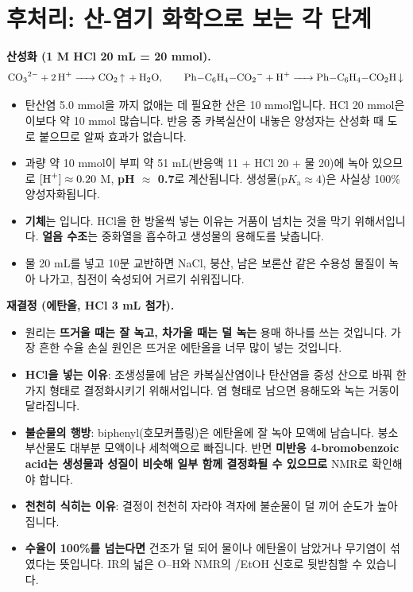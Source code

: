 \documentclass[10pt,a4paper]{article}
\begin{document}
\section{후처리: 산-염기 화학으로 보는 각 단계}

\textbf{산성화 (1 M HCl 20 mL = 20 mmol).}
\[
\ce{CO3^2- + 2 H+ -> CO2 ^ + H2O}, \qquad \ce{Ph-C6H4-CO2^- + H+ -> Ph-C6H4-CO2H v}
\]
\begin{itemize}[leftmargin=5mm,itemsep=0.5mm,topsep=0.5mm]
\item 탄산염 5.0 mmol을 까지 없애는 데 필요한 산은 10 mmol입니다. HCl 20 mmol은 이보다 약 10 mmol 많습니다. 반응 중 카복실산이 내놓은 양성자는 산성화 때 도로 붙으므로 알짜 효과가 없습니다.
\item 과량  약 10 mmol이 부피 약 51 mL(반응액 11 + HCl 20 + 물 20)에 녹아 있으므로 $[\ce{H+}]\approx 0.20$ M, \textbf{pH $\approx$ 0.7}로 계산됩니다. 생성물(p$K_\text{a}\approx4$)은 사실상 100\% 양성자화됩니다.
\item \textbf{기체}는 입니다. HCl을 한 방울씩 넣는 이유는 거품이 넘치는 것을 막기 위해서입니다. \textbf{얼음 수조}는 중화열을 흡수하고 생성물의 용해도를 낮춥니다.
\item 물 20 mL를 넣고 10분 교반하면 NaCl, 붕산, 남은 보론산 같은 수용성 물질이 녹아 나가고, 침전이 숙성되어 거르기 쉬워집니다.
\end{itemize}

\textbf{재결정 (에탄올, HCl 3 mL 첨가).}
\begin{itemize}[leftmargin=5mm,itemsep=0.5mm,topsep=0.5mm]
\item 원리는 \textbf{뜨거울 때는 잘 녹고, 차가울 때는 덜 녹는} 용매 하나를 쓰는 것입니다. 가장 흔한 수율 손실 원인은 뜨거운 에탄올을 너무 많이 넣는 것입니다.
\item \textbf{HCl을 넣는 이유}: 조생성물에 남은 카복실산염이나 탄산염을 중성 산으로 바꿔 한 가지 형태로 결정화시키기 위해서입니다. 염 형태로 남으면 용해도와 녹는 거동이 달라집니다.
\item \textbf{불순물의 행방}: biphenyl(호모커플링)은 에탄올에 잘 녹아 모액에 남습니다. 붕소 부산물도 대부분 모액이나 세척액으로 빠집니다. 반면 \textbf{미반응 4-bromobenzoic acid는 생성물과 성질이 비슷해 일부 함께 결정화될 수 있으므로} NMR로 확인해야 합니다.
\item \textbf{천천히 식히는 이유}: 결정이 천천히 자라야 격자에 불순물이 덜 끼어 순도가 높아집니다.
\item \textbf{수율이 100\%를 넘는다면} 건조가 덜 되어 물이나 에탄올이 남았거나 무기염이 섞였다는 뜻입니다. IR의 넓은 O--H와 NMR의 /EtOH 신호로 뒷받침할 수 있습니다.
\end{itemize}
\end{document}
